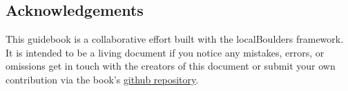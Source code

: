 \raggedcolumns
\begin{multicols}{2}

\section{Acknowledgements}
This guidebook is a collaborative effort built with the localBoulders framework. It is intended to be a living document if you notice any mistakes, errors, or omissions get in touch with the creators of this document or submit your own contribution via the book's \underline{\textcolor{blue}{\href{\VAR{book.repo}}{github repository}}}.
\end{multicols}
\clearpage